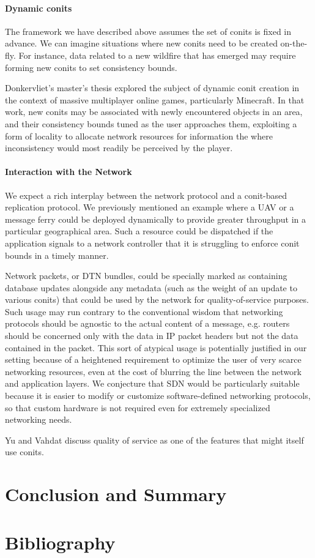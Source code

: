 \documentclass[]             %
{NASA}                       %
\theoremstyle{definition}
\begin{document}
\paragraph{Dynamic conits}
The framework we have described above assumes the set of conits is
fixed in advance. We can imagine situations where new conits need to
be created on-the-fly. For instance, data related to a new wildfire
that has emerged may require forming new conits to set consistency
bounds.

Donkervliet's master's thesis \citationneeded explored the subject of
dynamic conit creation in the context of massive multiplayer online
games, particularly Minecraft. In that work, new conits may be
associated with newly encountered objects in an area, and their
consistency bounds tuned as the user approaches them, exploiting a
form of locality to allocate network resources for information the
where inconsistency would most readily be perceived by the player.

\paragraph{Interaction with the Network}
We expect a rich interplay between the network protocol and a
conit-based replication protocol. We previously mentioned an example
where a UAV or a message ferry could be deployed dynamically to
provide greater throughput in a particular geographical area. Such a
resource could be dispatched if the application signals to a network
controller that it is struggling to enforce conit bounds in a timely
manner.

Network packets, or DTN bundles, could be specially marked as
containing database updates alongside any metadata (such as the weight
of an update to various conits) that could be used by the network for
quality-of-service purposes. Such usage may run contrary to the
conventional wisdom that networking protocols should be agnostic to
the actual content of a message, e.g. routers should be concerned only
with the data in IP packet headers but not the data contained in the
packet. This sort of atypical usage is potentially justified in our
setting because of a heightened requirement to optimize the user of
very scarce networking resources, even at the cost of blurring the
line between the network and application layers. We conjecture that
SDN would be particularly suitable because it is easier to modify or
customize software-defined networking protocols, so that custom
hardware is not required even for extremely specialized networking
needs.

Yu and Vahdat discuss quality of service as one of the features that
might itself use conits.

\section{Conclusion and Summary}
\label{sec:conclusion}

\section*{Bibliography}\label{bibliography}



\end{document}

